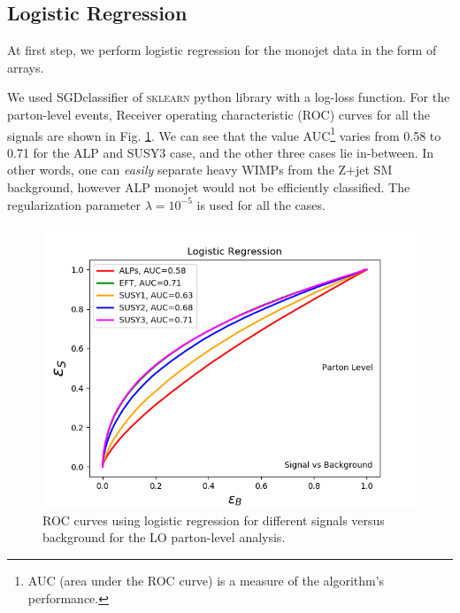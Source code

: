 \documentclass[prd,aps,letterpaper,floatfix,superscriptaddress,preprintnumbers,twocolumn,10pt,nofootinbib]{revtex4-1}
\begin{document}
\subsection{Logistic Regression}
At first step, we perform logistic regression for the monojet data in the form of arrays. 

We used SGDclassifier of \textsc{sklearn} python library with a log-loss function.  For the parton-level events, Receiver operating characteristic (ROC) curves for all the signals are shown in Fig. \ref{rocLO-LR}. We can see that the value AUC\footnote{AUC (area under the ROC curve) is a measure of the algorithm's performance.} varies from 0.58 to 0.71 for the ALP and SUSY3 case, and the other three cases lie in-between. In other words, one can {\it easily} separate heavy WIMPs from the Z$+$jet SM background, however ALP monojet would not be efficiently classified. The regularization parameter $\lambda= 10^{-5}$ is used for all the cases.
\begin{figure}[h!]
\centering
\includegraphics[scale=0.50]{figures/ROCsbLR.png}
\caption{ROC curves using logistic regression for different signals versus background for the LO parton-level analysis.}\label{rocLO-LR}
\end{figure}

\end{document}
